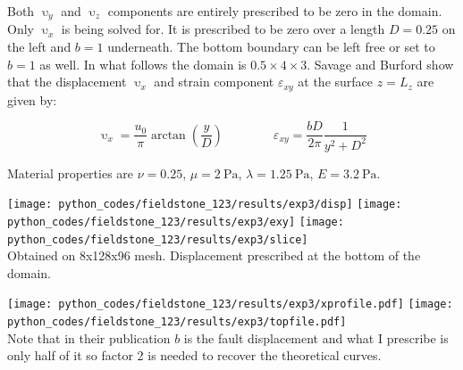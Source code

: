Both $\upupsilon_y$ and $\upupsilon_z$ 
components are entirely prescribed to be zero in the domain. 
Only $\upupsilon_x$ is being solved for. It is prescribed to be zero 
over a length $D=0.25$ on the left and $b=1$ underneath. 
The bottom boundary can be left free or set to $b=1$ as well.
In what follows the domain is $0.5\times 4\times 3$.
Savage and Burford \cite{sabu73} show that the displacement $\upupsilon_x$ 
and strain component ${\varepsilon}_{xy}$ at the surface $z=L_z$ are given by:

\[
\upupsilon_x=\frac{u_0}{\pi} \arctan\left(\frac{y}{D}\right)
\quad\quad
\quad\quad
{\varepsilon}_{xy} = \frac{bD}{2\pi}  \frac{1}{y^2+D^2}
\]

Material properties are $\nu=0.25$, $\mu=\SI{2}{\pascal}$, $\lambda=\SI{1.25}{\pascal}$,
$E=\SI{3.2}{\pascal}$. 

\begin{center}
\texttt{[image: python\_codes/fieldstone\_123/results/exp3/disp]}
\texttt{[image: python\_codes/fieldstone\_123/results/exp3/exy]}
\texttt{[image: python\_codes/fieldstone\_123/results/exp3/slice]}\\
{\captionfont Obtained on 8x128x96 mesh. Displacement prescribed at the bottom of the domain.}
\end{center}


\begin{center}
\texttt{[image: python\_codes/fieldstone\_123/results/exp3/xprofile.pdf]}
\texttt{[image: python\_codes/fieldstone\_123/results/exp3/topfile.pdf]}\\
{\captionfont Note that in their publication $b$ is the fault displacement 
and what I prescribe is only half of it so factor 2 is needed to recover the theoretical curves.}
\end{center}



